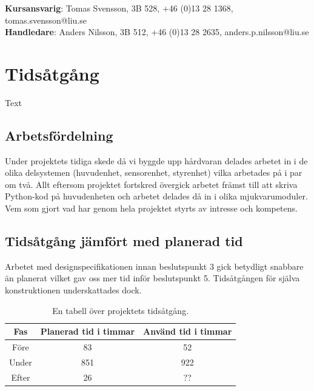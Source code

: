 \documentclass{article}
\begin{document}
\begin{center}
\textbf{Kursansvarig}: Tomas Svensson, 3B 528, +46 (0)13 28 1368, tomas.svensson@liu.se \\
\textbf{Handledare}: Anders Nilsson, 3B 512, +46 (0)13 28 2635, anders.p.nilsson@liu.se
\end{center}
\vspace*{\fill}
\clearpage

\renewcommand*\contentsname{Innehållsförteckning}
\tableofcontents

\clearpage
\section{Tidsåtgång}
Text


\subsection{Arbetsfördelning}
Under projektets tidiga skede då vi byggde upp hårdvaran delades arbetet in i de olika delsystemen (huvudenhet, sensorenhet, styrenhet) vilka arbetades på i par om två. Allt eftersom projektet fortskred övergick arbetet främst till att skriva Python-kod på huvudenheten och arbetet delades då in i olika mjukvarumoduler. Vem som gjort vad har genom hela projektet styrts av intresse och kompetens.


\subsection{Tidsåtgång jämfört med planerad tid}
Arbetet med designspecifikationen innan beslutspunkt 3 gick betydligt snabbare än planerat vilket gav oss mer tid inför beslutspunkt 5. Tidsåtgången för själva konstruktionen underskattades dock.

\begin{table}[H]
\centering
\caption{En tabell över projektets tidsåtgång.}
\begin{tabular}{ | c | c | c | }
\hline
Fas & Planerad tid i timmar & Använd tid i timmar \\
\hline
Före & 83 & 52 \\
\hline
Under & 851 & 922 \\
\hline
Efter & 26 & ?? \\
\hline
\end{tabular}
\label{table:tidsatgang}
\end{table}
\ \\


\clearpage
\end{document}
